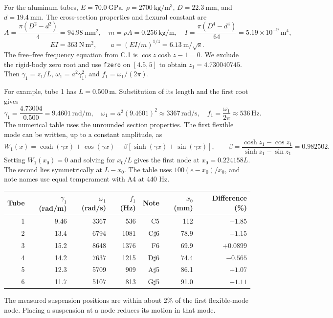 For the aluminum tubes, \(E=70.0\ \mathrm{GPa}\), \(\rho=2700\ \mathrm{kg/m^3}\), \(D=22.3\ \mathrm{mm}\), and \(d=19.4\ \mathrm{mm}\). The cross-section properties and flexural constant are
\[
A=\frac{\pi(D^2-d^2)}4=94.98\ \mathrm{mm^2},\quad
m=\rho A=0.256\ \mathrm{kg/m},\quad
I=\frac{\pi(D^4-d^4)}{64}=5.19\times10^{-9}\ \mathrm{m^4},
\]
\[
EI=363\ \mathrm{N\,m^2},\qquad a=(EI/m)^{1/4}=6.13\ \mathrm{m/\sqrt{s}}.
\]
The free--free frequency equation from C.1 is \(\cos z\cosh z-1=0\). We exclude the rigid-body zero root and use \texttt{fzero} on \([4.5,5]\) to obtain \(z_1=4.730040745\). Then \(\gamma_1=z_1/L\), \(\omega_1=a^2\gamma_1^2\), and \(f_1=\omega_1/(2\pi)\).

For example, tube 1 has $L=0.500\,\mathrm m$. Substitution of its length and the first root gives
\[
\gamma_1=\frac{4.73004}{0.500}=9.4601\,\mathrm{rad/m},\quad
\omega_1=a^2(9.4601)^2\approx 3367\,\mathrm{rad/s},\quad
f_1=\frac{\omega_1}{2\pi}\approx536\,\mathrm{Hz}.
\]
The numerical table uses the unrounded section properties. The first flexible mode can be written, up to a constant amplitude, as
\[
W_1(x)=\cosh(\gamma x)+\cos(\gamma x)-\beta
 [\sinh(\gamma x)+\sin(\gamma x)],\qquad
\beta=\frac{\cosh z_1-\cos z_1}{\sinh z_1-\sin z_1}=0.982502.
\]
Setting $W_1(x_0)=0$ and solving for $x_0/L$ gives the first node at \(x_0=0.224158L\). The second lies symmetrically at \(L-x_0\). The table uses \(100(e-x_0)/x_0\), and note names use equal temperament with A4 at 440 Hz.
\begin{center}\small\begin{tabular}{rrrrrrr}\toprule
Tube & \(\gamma_1\) (rad/m) & \(\omega_1\) (rad/s) & \(f_1\) (Hz) & Note & \(x_0\) (mm) & Difference (\%)\\\midrule
1&9.46&3367&536&C5&112&$-1.85$\\
2&13.4&6794&1081&C\ensuremath{\sharp}6&78.9&$-1.15$\\
3&15.2&8648&1376&F6&69.9&$+0.0899$\\
4&14.2&7637&1215&D\ensuremath{\sharp}6&74.4&$-0.565$\\
5&12.3&5709&909&A\ensuremath{\sharp}5&86.1&$+1.07$\\
6&11.7&5107&813&G\ensuremath{\sharp}5&91.0&$-1.11$\\\bottomrule\end{tabular}\end{center}
The measured suspension positions are within about 2\% of the first flexible-mode node. Placing a suspension at a node reduces its motion in that mode.

